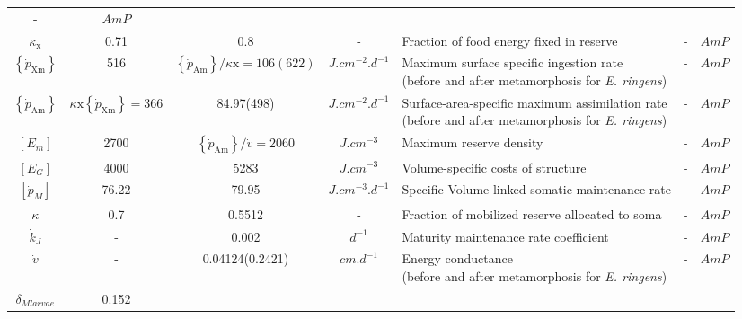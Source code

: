 \begin{table}[ht]
\begin{adjustbox}{width=1.2\textwidth}
\begin{tabular}{c|c|c|c|l|c|c}
-											&
$AmP$										\\
$\kappa_{\mathrm{x}} $						& 
0.71										& 
0.8											& 
-											& 
Fraction of food energy fixed in reserve	&
-											&
$AmP$										\\
$\left \{ \dot{p}_\mathrm{Xm} \right \}$								&
516																		& 
$\left \{ \dot{p}_\mathrm{Am} \right \}/\kappa \mathrm{x} = 106(622)$	& 
$J.cm^{-2}.d^{-1}$														& 
\makecell[l]{Maximum surface specific ingestion rate \\ (before and after metamorphosis for \textit{E. ringens})}																&
-																		&
$AmP$																	\\
$\left \{ \dot{p}_\mathrm{Am} \right \}$							& 
$ \kappa \mathrm{x} \left \{ \dot{p}_\mathrm{Xm} \right \}= 366$	&
84.97(498)															&
$J.cm^{-2}.d^{-1}$													&
\makecell[l]{Surface-area-specific maximum assimilation rate \\ (before and after metamorphosis for \textit{E. ringens})}												&
-																	& 
$AmP$																\\
$\left[ E_{m} \right]$									&
2700													&
$\left \{ \dot{p}_\mathrm{Am} \right \}/\dot{v}=2060$	&
$J.cm^{-3}$												&
Maximum reserve density									&
-														& 
$AmP$													\\
$\left[ E_{G} \right]$				&
4000								&
5283								&
$J.cm^{-3}$							& 
Volume-specific costs of structure &
-									&
$AmP$								\\
$\left [ \dot{p}_{M} \right ]$						& 
76.22												&
79.95												& 
$J.cm^{-3}.d^{-1}$									&
Specific Volume-linked somatic maintenance rate	&
-													&
$AmP$												\\
$\kappa$											&
0.7													& 
0.5512												& 
-													& 
Fraction of mobilized reserve allocated to soma	&
-													&
$AmP$												\\
$\dot{k}_{J}$							& 
-										& 
0.002									& 
$d^{-1}$								& 
Maturity maintenance rate coefficient	&
-										&
$AmP$									\\
$\dot{v}$																						& 
-																								& 
0.04124(0.2421)																					& 
$cm. d^{-1}$																					& 
\makecell[l]{Energy conductance \\ (before and after metamorphosis for \textit{E. ringens})}	&
-																								&
$AmP$																							\\
$\delta_{Mlarvae}$				& 
0.152							& 

\end{tabular}
\end{adjustbox}
\end{table}
